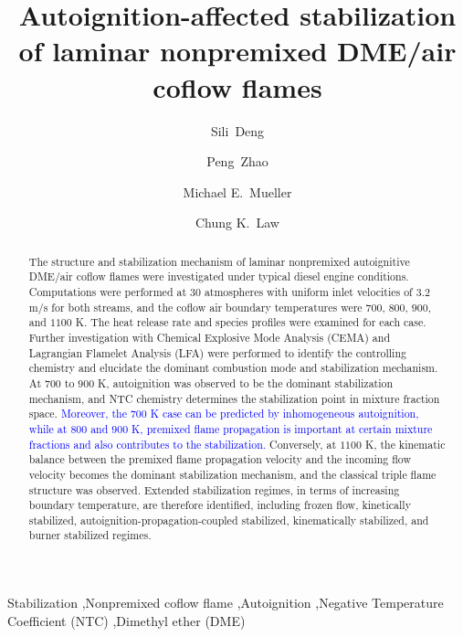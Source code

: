 \documentclass[review,3p,times]{elsarticle}
\begin{document}
\begin{frontmatter}

\title{Autoignition-affected stabilization of laminar nonpremixed DME/air coflow flames}

\author{Sili~Deng}
\author{Peng~Zhao}
\author{Michael E.~Mueller}
\author{Chung K.~Law}

\address{Department of Mechanical and Aerospace Engineering, Princeton University, Princeton, NJ 08544, USA}

\begin{abstract}

The structure and stabilization mechanism of laminar nonpremixed autoignitive DME/air coflow flames were investigated under typical diesel engine conditions.  Computations were performed at $30$ atmospheres with uniform inlet velocities of $3.2$ m/s for both streams, and the coflow air boundary temperatures were $700$, $800$, $900$, and $1100$ K.  The heat release rate and species profiles were examined for each case. Further investigation with Chemical Explosive Mode Analysis (CEMA) and Lagrangian Flamelet Analysis (LFA) were performed to identify the controlling chemistry and elucidate the dominant combustion mode and stabilization mechanism.  At $700$ to $900$ K, autoignition was observed to be the dominant stabilization mechanism, and NTC chemistry determines the stabilization point in mixture fraction space.  \textcolor{blue}{Moreover, the $700$ K case can be predicted by inhomogeneous autoignition, while at $800$ and $900$ K, premixed flame propagation is important at certain mixture fractions and also contributes to the stabilization.}  Conversely, at $1100$ K, the kinematic balance between the premixed flame propagation velocity and the incoming flow velocity becomes the dominant stabilization mechanism, and the classical triple flame structure was observed.  Extended stabilization regimes, in terms of increasing boundary temperature, are therefore identified, including frozen flow, kinetically stabilized, autoignition-propagation-coupled stabilized, kinematically stabilized, and burner stabilized regimes.           

\end{abstract}

\begin{keyword} 
Stabilization \sep Nonpremixed coflow flame \sep Autoignition \sep Negative Temperature Coefficient (NTC) \sep Dimethyl ether (DME) 
\end{keyword}

\end{frontmatter}
\end{document}
